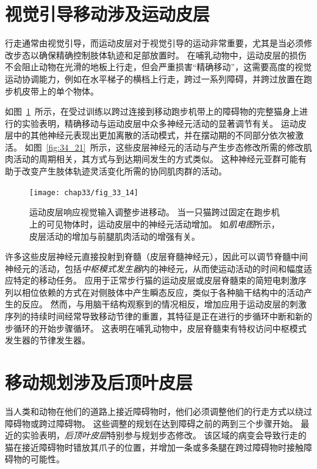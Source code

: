 \section{视觉引导移动涉及运动皮层}

行走通常由视觉引导，而运动皮层对于视觉引导的运动非常重要，尤其是当必须修改步态以确保精确控制肢体轨迹和足部放置时。
在哺乳动物中，运动皮层的损伤不会阻止动物在光滑的地板上行走，但会严重损害“精确移动”，这需要高度的视觉运动协调能力，例如在水平梯子的横档上行走，跨过一系列障碍，并跨过放置在跑步机皮带上的单个物体。


如图~\ref{fig:33_14}~所示，在受过训练以跨过连接到移动跑步机带上的障碍物的完整猫身上进行的实验表明，精确移动与运动皮层中众多神经元活动的显著调节有关。
运动皮层中的其他神经元表现出更加离散的活动模式，并在摆动期的不同部分依次被激活。
如图~\ref{fig:34_21}~所示，这些皮层神经元的活动与产生步态修改所需的修改肌肉活动的周期相关，其方式与到达期间发生的方式类似。
这种神经元亚群可能有助于改变产生肢体轨迹灵活变化所需的协同肌肉群的活动。


\begin{figure}[htbp]
	\centering
	\texttt{[image: chap33/fig\_33\_14]}
	\caption{运动皮层响应视觉输入调整步进移动。
		当一只猫跨过固定在跑步机上的可见物体时，运动皮层中的神经元活动增加。
		如\textit{肌电图}所示，皮层活动的增加与前腿肌肉活动的增强有关\cite{drew1988motor}。}
	\label{fig:33_14}
\end{figure}


许多这些皮层神经元直接投射到脊髓（皮层脊髓神经元），因此可以调节脊髓中间神经元的活动，包括\textit{中枢模式发生器}内的神经元，从而使运动活动的时间和幅度适应特定的移动任务。
应用于正常步行猫的运动皮层或皮层脊髓束的简短电刺激序列以相位依赖的方式在对侧肢体中产生瞬态反应，类似于各种脑干结构中的活动产生的反应。
然而，与用脑干结构观察到的情况相反，增加应用于运动皮层的刺激序列的持续时间经常导致移动节律的重置，其特征是正在进行的步循环中断和新的步循环的开始步骤循环。
这表明在哺乳动物中，皮层脊髓束有特权访问中枢模式发生器的节律发生器。



\section{移动规划涉及后顶叶皮层}

当人类和动物在他们的道路上接近障碍物时，他们必须调整他们的行走方式以绕过障碍物或跨过障碍物。
这些调整的规划在达到障碍之前的两到三个步骤开始。
最近的实验表明，\textit{后顶叶皮层}特别参与规划步态修改。
该区域的病变会导致行走的猫在接近障碍物时错放其爪子的位置，并增加一条或多条腿在跨过障碍物时接触障碍物的可能性。


